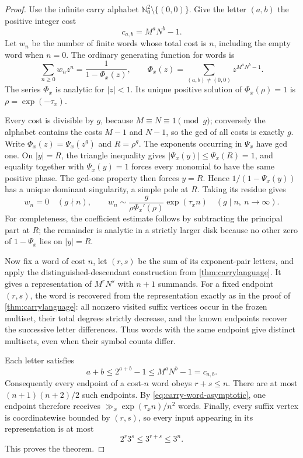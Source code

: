 \documentclass[11pt,oneside]{article}
\theoremstyle{definition}
\newcommand{\N}{\mathbb{N}}
\begin{document}
\begin{proof}
Use the infinite carry alphabet
$\N_0^2\setminus\{(0,0)\}$.  Give the letter $(a,b)$ the positive integer cost
\[
       c_{a,b}=M^aN^b-1.
\]
Let $w_n$ be the number of finite words whose total cost is $n$, including the empty word when $n=0$.  The ordinary generating function for words is
\begin{equation}\label{eq:carry-word-gf}
 \sum_{n\ge0}w_nz^n
 =\frac{1}{1-\Phi_x(z)},
 \qquad
 \Phi_x(z)=
 \sum_{(a,b)\ne(0,0)}z^{M^aN^b-1}.
\end{equation}
The series $\Phi_x$ is analytic for $|z|<1$.  Its unique positive solution of $\Phi_x(\rho)=1$ is
$\rho=\exp(-\tau_x)$.

Every cost is divisible by $g$, because $M\equiv N\equiv1\pmod g$; conversely the alphabet contains the costs $M-1$ and $N-1$, so the gcd of all costs is exactly $g$.  Write
$\Phi_x(z)=\Psi_x(z^g)$ and $R=\rho^g$.  The exponents occurring in $\Psi_x$ have gcd one.  On $|y|=R$, the triangle inequality gives
$|\Psi_x(y)|\le\Psi_x(R)=1$, and equality together with $\Psi_x(y)=1$ forces every monomial to have the same positive phase.  The gcd-one property then forces $y=R$.  Hence
$1/(1-\Psi_x(y))$ has a unique dominant singularity, a simple pole at $R$.  Taking its residue gives
\begin{equation}\label{eq:carry-word-asymptotic}
       w_n=0\quad(g\nmid n),
       \qquad
       w_n\sim
       \frac{g}{\rho\Phi_x'(\rho)}\exp(\tau_x n)
       \quad(g\mid n,
       \ n\to\infty).
\end{equation}
For completeness, the coefficient estimate follows by subtracting the principal part at $R$; the remainder is analytic in a strictly larger disk because no other zero of $1-\Psi_x$ lies on $|y|=R$.

Now fix a word of cost $n$, let $(r,s)$ be the sum of its exponent-pair letters, and apply the distinguished-descendant construction from \cref{thm:carrylanguage}.  It gives a representation of $M^rN^s$ with $n+1$ summands.  For a fixed endpoint $(r,s)$, the word is recovered from the representation exactly as in the proof of \cref{thm:carrylanguage}: all nonzero visited suffix vertices occur in the frozen multiset, their total degrees strictly decrease, and the known endpoints recover the successive letter differences.  Thus words with the same endpoint give distinct multisets, even when their symbol counts differ.

Each letter satisfies
\[
       a+b\le 2^{a+b}-1\le M^aN^b-1=c_{a,b}.
\]
Consequently every endpoint of a cost-$n$ word obeys $r+s\le n$.  There are at most
$(n+1)(n+2)/2$ such endpoints.  By \eqref{eq:carry-word-asymptotic}, one endpoint therefore receives
$\gg_x\exp(\tau_x n)/n^2$ words.  Finally, every suffix vertex is coordinatewise bounded by $(r,s)$, so every input appearing in its representation is at most
\[
       2^r3^s\le3^{r+s}\le3^n.
\]
This proves the theorem.


\end{proof}
\end{document}
